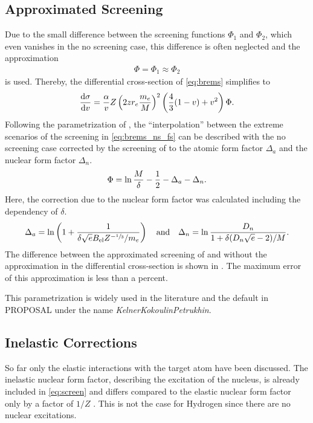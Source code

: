 \subsection{Approximated Screening} \label{sec:brems_screen_approx}

Due to the small difference between the screening functions $\Phi_1$ and $\Phi_2$, which even vanishes in the no screening case, this difference is often neglected and the approximation
\begin{align} \label{eq:screen_approx}
    \Phi = \Phi_1 \approx \Phi_2
\end{align}
is used.
Thereby, the differential cross-section of \eqref{eq:brems} simplifies to
\begin{align} \label{eq:brems_approx}
\frac{\mathrm{d} \sigma}{\mathrm{d} v} =
    \frac{\alpha}{v} Z \left(2z r_e \frac{m_e}{M}\right)^2
    \left( \frac{4}{3}(1 - v) + v^2 \right) \Phi .
\end{align}
Following the parametrization of \cite{Kelner95Brems}, the \enquote{interpolation} between the extreme scenarios of the screening in \eqref{eq:brems_ns_fs} can be described with the no screening case corrected by the screening of to the atomic form factor $\Delta_a$ and the nuclear form factor $\Delta_n$.
\begin{align}
    \Phi = \operatorname{ln} \frac{M}{\delta} - \frac12 - \Delta_a - \Delta_n .
\end{align}
Here, the correction due to the nuclear form factor was calculated including the dependency of $\delta$.
\begin{align}
	\Delta_a = \operatorname{ln} \left( 1 + \frac{1}{\delta \sqrt{e} B_{\text{el}} Z^{-\sfrac13} / m_e} \right)
    \quad
    \text{and}
    \quad
    \Delta_n = \operatorname{ln} \frac{D_n}{1 + \delta (D_n \sqrt{e} - 2) / M} .
\end{align}
The difference between the approximated screening of \cite{Kelner95Brems} and without the approximation \cite{Sandrock18PhD} in the differential cross-section is shown in .
The maximum error of this approximation is less than a percent.

This parametrization is widely used in the literature and the default in PROPOSAL under the name \textit{KelnerKokoulinPetrukhin}.

\subsection{Inelastic Corrections} \label{sec:brems_inel}

So far only the elastic interactions with the target atom have been discussed.
The inelastic nuclear form factor, describing the excitation of the nucleus, is already included in \eqref{eq:screen} and differs compared to the elastic nuclear form factor only by a factor of $1/Z$ \cite{Andreev94Brems}.
This is not the case for Hydrogen since there are no nuclear excitations.

